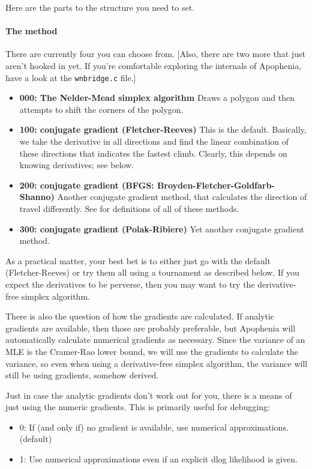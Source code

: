 Here are the parts to the  
structure you need to set. 

\paragraph{The method} There are currently four you can choose from.
[Also, there are two more that  just aren't hooked in yet. If you're
comfortable exploring the internals of Apophenia, have a look at the
{\tt wnbridge.c} file.]


\begin{itemize}
\item {\bf 000: The Nelder-Mead simplex algorithm} Draws a polygon and then attempts to shift the corners of the polygon.
\item {\bf 100: conjugate gradient (Fletcher-Reeves)} This is the
default. Basically, we take the derivative in all directions and find
the linear combination of these directions that indicates the fastest
climb. Clearly, this depends on knowing derivatives; see below.
\item {\bf 200: conjugate gradient (BFGS: Broyden-Fletcher-Goldfarb-Shanno)}  Another conjugate gradient method, that calculates the direction of travel differently. See \cite{avriel:nonlinear} for definitions of all of these methods.
\item {\bf 300: conjugate gradient (Polak-Ribiere)} Yet another conjugate gradient method.
\end{itemize}

As a practical matter, your best bet is to either just go with the default (Fletcher-Reeves) or try them all using a tournament as described below. 
If you expect the derivatives to be perverse, then you may want to try the derivative-free simplex algorithm.

There is also the question of how the gradients are calculated. If
analytic gradients are available, then those are probably preferable, but
Apophenia will automatically calculate numerical gradients as necessary.
Since the variance of an MLE is the Cramer-Rao lower bound, we will use
the gradients to calculate the variance, so even when using a
derivative-free simplex algorithm, the variance will still be using
gradients, somehow derived.

Just in case the analytic gradients don't work out for you, there is a
means of just using the numeric gradients. This is primarily useful for debugging:

\begin{itemize}
\item 0: If (and only if) no gradient is available, use numerical approximations.  (default)
\item 1: Use numerical approximations even if an explicit dlog likelihood is given. 
\end{itemize}

